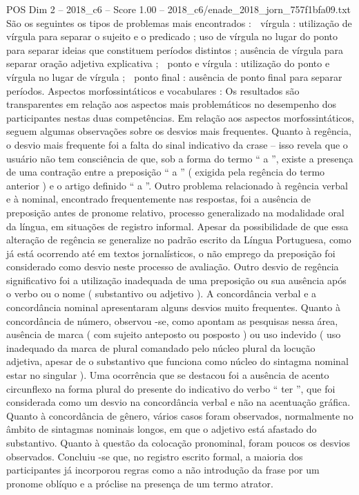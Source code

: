 \begin{textsample}{POS Dim 2 – 2018\_c6 – Score 1.00 – 2018\_c6/enade\_2018\_jorn\_757f1bfa09.txt}
São os seguintes os tipos de problemas mais encontrados :  vírgula : utilização de vírgula para separar o sujeito e o predicado ; uso de vírgula no lugar do ponto para separar ideias que constituem períodos distintos ; ausência de vírgula para separar oração adjetiva explicativa ;  ponto e vírgula : utilização do ponto e vírgula no lugar de vírgula ;  ponto final : ausência de ponto final para separar períodos.
Aspectos morfossintáticos e vocabulares : Os resultados são transparentes em relação aos aspectos mais problemáticos no desempenho dos participantes nestas duas competências.
Em relação aos aspectos morfossintáticos, seguem algumas observações sobre os desvios mais frequentes.
Quanto à regência, o desvio mais frequente foi a falta do sinal indicativo da crase – isso revela que o usuário não tem consciência de que, sob a forma do termo “ a ”, existe a presença de uma contração entre a preposição “ a ” ( exigida pela regência do termo anterior ) e o artigo definido “ a ”.
Outro problema relacionado à regência verbal e à nominal, encontrado frequentemente nas respostas, foi a ausência de preposição antes de pronome relativo, processo generalizado na modalidade oral da língua, em situações de registro informal.
Apesar da possibilidade de que essa alteração de regência se generalize no padrão escrito da Língua Portuguesa, como já está ocorrendo até em textos jornalísticos, o não emprego da preposição foi considerado como desvio neste processo de avaliação.
Outro desvio de regência significativo foi a utilização inadequada de uma preposição ou sua ausência após o verbo ou o nome ( substantivo ou adjetivo ).
A concordância verbal e a concordância nominal apresentaram alguns desvios muito frequentes.
Quanto à concordância de número, observou -se, como apontam as pesquisas nessa área, ausência de marca ( com sujeito anteposto ou posposto ) ou uso indevido ( uso inadequado da marca de plural comandado pelo núcleo plural da locução adjetiva, apesar de o substantivo que funciona como núcleo do sintagma nominal estar no singular ).
Uma ocorrência que se destacou foi a ausência de acento circunflexo na forma plural do presente do indicativo do verbo “ ter ”, que foi considerada como um desvio na concordância verbal e não na acentuação gráfica.
Quanto à concordância de gênero, vários casos foram observados, normalmente no âmbito de sintagmas nominais longos, em que o adjetivo está afastado do substantivo.
Quanto à questão da colocação pronominal, foram poucos os desvios observados.
Concluiu -se que, no registro escrito formal, a maioria dos participantes já incorporou regras como a não introdução da frase por um pronome oblíquo e a próclise na presença de um termo atrator.

\end{textsample}
